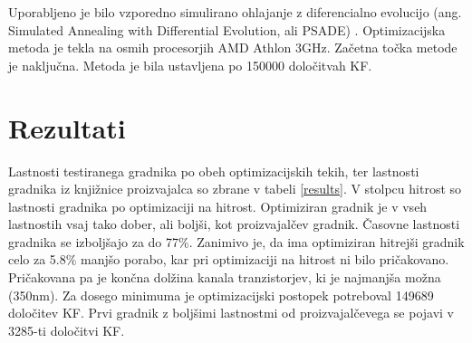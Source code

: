 \documentclass[journal,a4paper,twoside]{sty/IEEEtran}
\begin{document}
Uporabljeno je bilo vzporedno simulirano ohlajanje z diferencialno evolucijo (ang. Simulated Annealing with Differential Evolution, ali PSADE) \cite{olensek}. Optimizacijska metoda je tekla na osmih procesorjih AMD Athlon 3GHz. Začetna točka metode je naključna. Metoda je bila ustavljena po 150000 določitvah KF.

\section{Rezultati}
Lastnosti testiranega gradnika po obeh optimizacijskih tekih, ter lastnosti gradnika iz knjižnice proizvajalca so zbrane v tabeli \ref{results}. V stolpcu hitrost so lastnosti gradnika po optimizaciji na hitrost. Optimiziran gradnik je v vseh lastnostih vsaj tako dober, ali boljši, kot proizvajalčev gradnik. Časovne lastnosti gradnika se izboljšajo za do 77\%. Zanimivo je, da ima optimiziran hitrejši gradnik celo za 5.8\% manjšo porabo, kar pri optimizaciji na hitrost ni bilo pričakovano. Pričakovana pa je končna dolžina kanala tranzistorjev, ki je najmanjša možna (350nm). Za dosego minimuma je optimizacijski postopek potreboval 149689 določitev KF. Prvi gradnik z boljšimi lastnostmi od proizvajalčevega se pojavi v 3285-ti določitvi KF.
\end{document}
